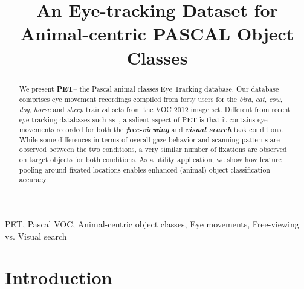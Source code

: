 \documentclass{article}
\begin{document}
\sloppy

\def\x{{\mathbf x}}
\def\L{{\cal L}}
\def\eg{\textit{e.g.}}
\def\ie{\textit{i.e.}}
\def\Eg{\textit{E.g.}}
\def\etal{\textit{et al.}}
\def\etc{\textit{etc.}}



\title{An Eye-tracking Dataset for Animal-centric PASCAL Object Classes}
\address{$^1$ SMME, National University of Sciences \& Technology, Islamabad, Pakistan \\
      $^2$ Advanced Digital Sciences Center, University of Illinois at Urbana-Champaign, Singapore \\
			$^3$ Department of Computer Science and Information Engineering, University of Trento, Italy \\
			$^4$ Department of Cognitive Sciences, University of Trento, Italy \\
			$^1$omer@smme.nust.edu.pk,$^2${subramanian.r,stefan.winkler}@adsc.com.sg}


\maketitle


\begin{abstract}
We present \textbf{PET}-- the Pascal animal classes Eye Tracking database. Our database comprises eye movement recordings compiled from forty users for the \textit{bird}, \textit{cat}, \textit{cow}, \textit{dog}, \textit{horse} and \textit{sheep} {trainval} sets from the VOC 2012 image set. Different from recent eye-tracking databases such as~\cite{kiwon_cvpr13_gaze,PapadopoulosCKF14}, a salient aspect of PET is that it contains eye movements recorded for both the \textit{\textbf{free-viewing}} and \textit{\textbf{visual search}} task conditions. While some differences in terms of overall gaze behavior and scanning patterns are observed between the two conditions, a very similar number of fixations are observed on target objects for both conditions. As a utility application, we show how feature pooling around fixated locations enables enhanced (animal) object classification accuracy.  
\end{abstract}
\begin{keywords}
PET, Pascal VOC, Animal-centric object classes, Eye movements, Free-viewing vs. Visual search
\end{keywords}


\section{Introduction}
\end{document}
